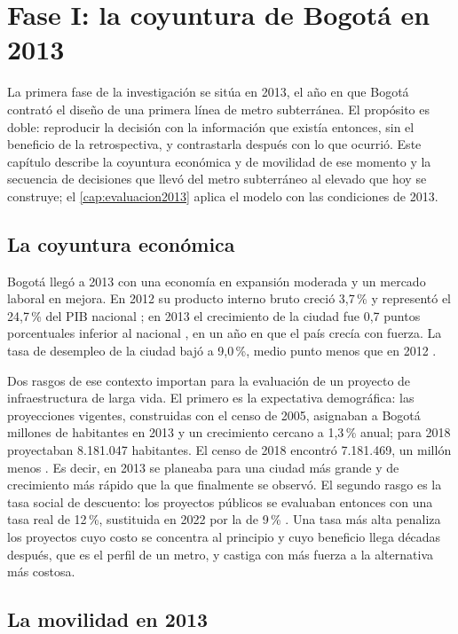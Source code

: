 \chapter{Fase I: la coyuntura de Bogotá en 2013}\label{cap:coyuntura2013}

La primera fase de la investigación se sitúa en 2013, el año en que Bogotá contrató el diseño de una
primera línea de metro subterránea. El propósito es doble: reproducir la decisión con la información
que existía entonces, sin el beneficio de la retrospectiva, y contrastarla después con lo que ocurrió.
Este capítulo describe la coyuntura económica y de movilidad de ese momento y la secuencia de
decisiones que llevó del metro subterráneo al elevado que hoy se construye; el
\cref{cap:evaluacion2013} aplica el modelo con las condiciones de 2013.

\section{La coyuntura económica}

Bogotá llegó a 2013 con una economía en expansión moderada y un mercado laboral en mejora. En 2012 su
producto interno bruto creció 3,7\,\% y representó el 24,7\,\% del PIB nacional \citep{icer2013}; en
2013 el crecimiento de la ciudad fue 0,7 puntos porcentuales inferior al nacional \citep{dane2014pib},
en un año en que el país crecía con fuerza. La tasa de desempleo de la ciudad bajó a 9,0\,\%, medio
punto menos que en 2012 \citep{icer2013}.

Dos rasgos de ese contexto importan para la evaluación de un proyecto de infraestructura de larga vida.
El primero es la expectativa demográfica: las proyecciones vigentes, construidas con el censo de 2005,
asignaban a Bogotá \PobBogotaDosMilTrece{} millones de habitantes en 2013 y un crecimiento cercano a
1,3\,\% anual; para 2018 proyectaban 8.181.047 habitantes. El censo de 2018 encontró 7.181.469, un
millón menos \citep{dane2019censo}. Es decir, en 2013 se planeaba para una ciudad más grande y de
crecimiento más rápido que la que finalmente se observó. El segundo rasgo es la tasa social de
descuento: los proyectos públicos se evaluaban entonces con una tasa real de 12\,\%, sustituida en 2022
por la de 9\,\% \citep{dnp2022}. Una tasa más alta penaliza los proyectos cuyo costo se concentra al
principio y cuyo beneficio llega décadas después, que es el perfil de un metro, y castiga con más
fuerza a la alternativa más costosa.

\section{La movilidad en 2013}

